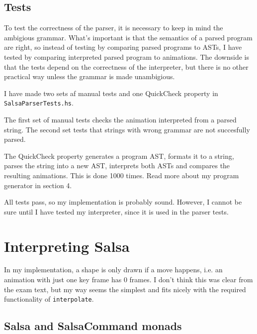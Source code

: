 \documentclass[10pt,a4paper]{article}
\begin{document}
\subsection{Tests}

To test the correctness of the parser, it is necessary to keep in mind the
ambigious grammar.  What's important is that the semantics of a parsed program
are right, so instead of testing by comparing parsed programs to ASTs, I have
tested by comparing interpreted parsed program to animations.  The downside is
that the tests depend on the correctness of the interpreter, but there is
no other practical way unless the grammar is made unambigious.

I have made two sets af manual tests and one QuickCheck property in
\verb+SalsaParserTests.hs+.

The first set of manual tests checks the animation interpreted from a parsed
string.  The second set tests that strings with wrong grammar are not
succesfully parsed.

The QuickCheck property generates a program AST, formats it to a string, parses
the string into a new AST, interprets both ASTs and compares the resulting
animations.  This is done 1000 times.  Read more about my program generator in
section 4.

All tests pass, so my implementation is probably sound.  However, I cannot be
sure until I have tested my interpreter, since it is used in the parser tests.



\newpage
\section{Interpreting Salsa}

In my implementation, a shape is only drawn if a move happens, i.e. an animation
with just one key frame has 0 frames.  I don't think this was clear from the
exam text, but my way seems the simplest and fits nicely with the required
functionality of \verb+interpolate+.


\subsection{Salsa and SalsaCommand monads}
\end{document}
